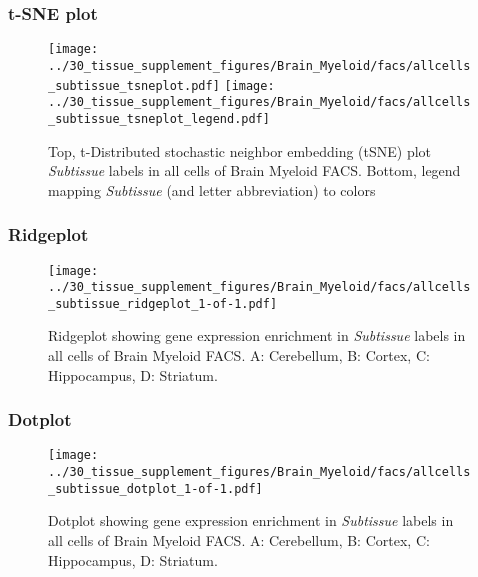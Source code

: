 \clearpage
\subsubsection{t-SNE plot}
\begin{figure}[h]
\centering
\texttt{[image: ../30\_tissue\_supplement\_figures/Brain\_Myeloid/facs/allcells\_subtissue\_tsneplot.pdf]}
\texttt{[image: ../30\_tissue\_supplement\_figures/Brain\_Myeloid/facs/allcells\_subtissue\_tsneplot\_legend.pdf]}
\caption{Top, t-Distributed stochastic neighbor embedding (tSNE) plot  \emph{Subtissue} labels in all cells of Brain Myeloid FACS. Bottom, legend mapping \emph{Subtissue} (and letter abbreviation) to colors}
\end{figure}


\clearpage

\subsubsection{Ridgeplot}
\begin{figure}[h]
\centering
\texttt{[image: ../30\_tissue\_supplement\_figures/Brain\_Myeloid/facs/allcells\_subtissue\_ridgeplot\_1-of-1.pdf]}

\caption{ Ridgeplot  showing gene expression enrichment in \emph{Subtissue} labels in all cells of Brain Myeloid FACS. A: Cerebellum, B: Cortex, C: Hippocampus, D: Striatum.}
\end{figure}


\clearpage

\subsubsection{Dotplot}
\begin{figure}[h]
\centering
\texttt{[image: ../30\_tissue\_supplement\_figures/Brain\_Myeloid/facs/allcells\_subtissue\_dotplot\_1-of-1.pdf]}

\caption{ Dotplot  showing gene expression enrichment in \emph{Subtissue} labels in all cells of Brain Myeloid FACS. A: Cerebellum, B: Cortex, C: Hippocampus, D: Striatum.}
\end{figure}

